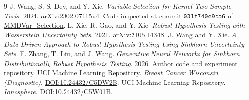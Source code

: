 \documentclass[11pt,a4paper]{article}
\begin{document}
\FloatBarrier
\begin{thebibliography}{9}
 J. Wang, S. S. Dey, and Y. Xie.
\emph{Variable Selection for Kernel Two-Sample Tests}. 2024.
\href{https://arxiv.org/abs/2302.07415}{arXiv:2302.07415v4}.
Code inspected at commit \texttt{031f740e9ca6} of
\href{https://github.com/WalterBabyRudin/MMDVar_Selection}{MMDVar\_Selection}.
 L. Xie, R. Gao, and Y. Xie.
\emph{Robust Hypothesis Testing with Wasserstein Uncertainty Sets}. 2021.
\href{https://arxiv.org/abs/2105.14348}{arXiv:2105.14348}.
 J. Wang and Y. Xie.
\emph{A Data-Driven Approach to Robust Hypothesis Testing Using Sinkhorn Uncertainty Sets}.
 F. Zhang, T. Liu, and J. Wang.
\emph{Generative Neural Networks for Sinkhorn Distributionally Robust Hypothesis Testing}. 2026.
\href{https://github.com/Arthas819/SDRHT}{Author code and experiment repository}.
 UCI Machine Learning Repository.
\emph{Breast Cancer Wisconsin (Diagnostic)}. \href{https://doi.org/10.24432/C5DW2B}{DOI:10.24432/C5DW2B}.
 UCI Machine Learning Repository.
\emph{Ionosphere}. \href{https://doi.org/10.24432/C5W01B}{DOI:10.24432/C5W01B}.
\end{thebibliography}
\end{document}
